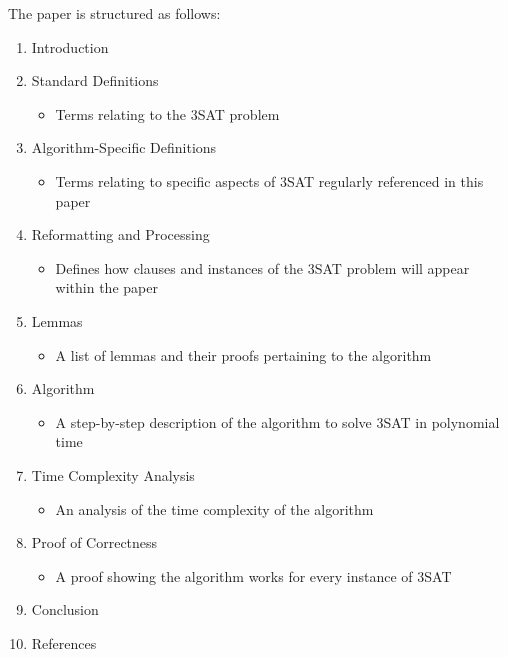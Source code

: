 \documentclass[manuscript]{acmart}
\begin{document}
        The paper is structured as follows:
        \begin{enumerate}
            \item Introduction
            \item Standard Definitions
            \begin{itemize}
                \item Terms relating to the 3SAT problem
            \end{itemize}
            \item Algorithm-Specific Definitions
            \begin{itemize}
                \item Terms relating to specific aspects of 3SAT regularly referenced in this paper
            \end{itemize}
            \item Reformatting and Processing
            \begin{itemize}
                \item Defines how clauses and instances of the 3SAT problem will appear within the paper
            \end{itemize}
            \item Lemmas
            \begin{itemize}
                \item A list of lemmas and their proofs pertaining to the algorithm
            \end{itemize}
            \item Algorithm
            \begin{itemize}
                \item A step-by-step description of the algorithm to solve 3SAT in polynomial time
            \end{itemize}
            \item Time Complexity Analysis
            \begin{itemize}
                \item An analysis of the time complexity of the algorithm
            \end{itemize}
            \item Proof of Correctness
            \begin{itemize}
                \item A proof showing the algorithm works for every instance of 3SAT
            \end{itemize}
            \item Conclusion
            \item References
        \end{enumerate}
        
\end{document}
